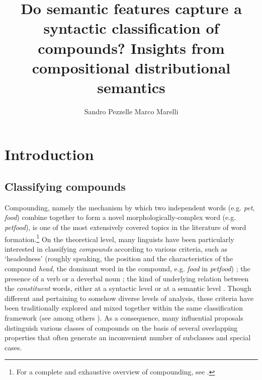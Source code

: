 \documentclass[output=paper]{langsci/langscibook}
\title{Do semantic features capture a syntactic classification of compounds? Insights from compositional distributional semantics}
\author{%
 Sandro Pezzelle\affiliation{CIMeC -- Center for Mind/Brain Sciences, University of Trento}\lastand
 Marco Marelli\affiliation{Department of Psychology, University of Milano-Bicocca}
}
\begin{document}
\maketitle

\section{Introduction}
\label{sec:introduction}

\subsection{Classifying compounds}\label{sec:class}


Compounding, namely the mechanism by which two independent words (e.g. \emph{pet}, \emph{food}) combine together to form a novel morphologically-complex word (e.g. \emph{petfood}), is one of the most extensively covered topics in the literature of word formation.\footnote{For a complete and exhaustive overview of compounding, see \cite{OHC}.} On the theoretical level, many linguists have been particularly interested in classifying \emph{compounds} according to various criteria, such as `headedness' (roughly speaking, the position and the characteristics of the compound \emph{head}, the dominant word in the compound, e.g. \emph{food} in \emph{petfood}) \citep{Bloomfield1933,fabb1998}; the presence of a verb or a deverbal noun \citep{marchand1969}; the kind of underlying relation between the \emph{constituent} words, either at a syntactic level \citep{Bloomfield1933,bally1950,lees1960,SB2005,baroni2006,dressler2006,sbOHC} or at a semantic level \citep{levi1978,warren1978,fanselow1981}. Though different and pertaining to somehow diverse levels of analysis, these criteria have been traditionally explored and mixed together within the same classification framework (see among others \citealt{bauer2001,hasp2002,Booij2005}). As a consequence, many influential proposals distinguish various classes of compounds on the basis of several overlapping properties that often generate an inconvenient number of subclasses and special cases.
\end{document}
